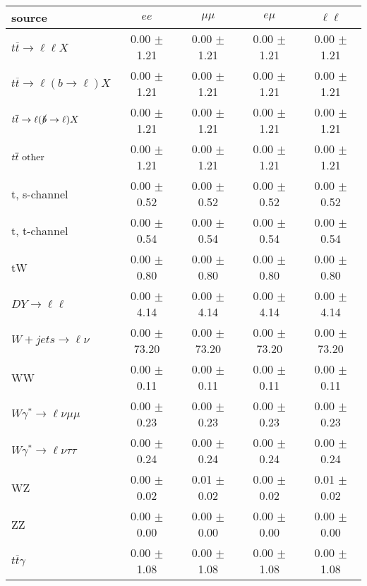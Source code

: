 \begin{tabular}{l|cccc} \hline\hline
source & $ee$ & $\mu\mu$ & $e\mu$ & $\ell\ell $ \\
\hline
$t\overline{t} \rightarrow \ell \ell X$ &  0.00 $\pm$  1.21 &  0.00 $\pm$  1.21 &  0.00 $\pm$  1.21 &  0.00 $\pm$  1.21 \\
$t\overline{t} \rightarrow \ell (b \rightarrow \ell) X$ &  0.00 $\pm$  1.21 &  0.00 $\pm$  1.21 &  0.00 $\pm$  1.21 &  0.00 $\pm$  1.21 \\
$t\overline{t} \rightarrow \ell (\slashed b \rightarrow \ell) X$ &  0.00 $\pm$  1.21 &  0.00 $\pm$  1.21 &  0.00 $\pm$  1.21 &  0.00 $\pm$  1.21 \\
        $t\overline{t}\ \rm{other}$ &  0.00 $\pm$  1.21 &  0.00 $\pm$  1.21 &  0.00 $\pm$  1.21 &  0.00 $\pm$  1.21 \\
\hline
                       t, s-channel &  0.00 $\pm$  0.52 &  0.00 $\pm$  0.52 &  0.00 $\pm$  0.52 &  0.00 $\pm$  0.52 \\
                       t, t-channel &  0.00 $\pm$  0.54 &  0.00 $\pm$  0.54 &  0.00 $\pm$  0.54 &  0.00 $\pm$  0.54 \\
                                 tW &  0.00 $\pm$  0.80 &  0.00 $\pm$  0.80 &  0.00 $\pm$  0.80 &  0.00 $\pm$  0.80 \\
\hline
         $DY \rightarrow \ell \ell$ &  0.00 $\pm$  4.14 &  0.00 $\pm$  4.14 &  0.00 $\pm$  4.14 &  0.00 $\pm$  4.14 \\
      $W+jets \rightarrow \ell \nu$ &  0.00 $\pm$ 73.20 &  0.00 $\pm$ 73.20 &  0.00 $\pm$ 73.20 &  0.00 $\pm$ 73.20 \\
                                 WW &  0.00 $\pm$  0.11 &  0.00 $\pm$  0.11 &  0.00 $\pm$  0.11 &  0.00 $\pm$  0.11 \\
\hline
$W\gamma^{*} \rightarrow \ell \nu \mu\mu$ &  0.00 $\pm$  0.23 &  0.00 $\pm$  0.23 &  0.00 $\pm$  0.23 &  0.00 $\pm$  0.23 \\
$W\gamma^{*} \rightarrow \ell \nu \tau\tau$ &  0.00 $\pm$  0.24 &  0.00 $\pm$  0.24 &  0.00 $\pm$  0.24 &  0.00 $\pm$  0.24 \\
                                 WZ &  0.00 $\pm$  0.02 &  0.01 $\pm$  0.02 &  0.00 $\pm$  0.02 &  0.01 $\pm$  0.02 \\
                                 ZZ &  0.00 $\pm$  0.00 &  0.00 $\pm$  0.00 &  0.00 $\pm$  0.00 &  0.00 $\pm$  0.00 \\
\hline
              $t\overline{t}\gamma$ &  0.00 $\pm$  1.08 &  0.00 $\pm$  1.08 &  0.00 $\pm$  1.08 &  0.00 $\pm$  1.08 \\

\end{tabular}
